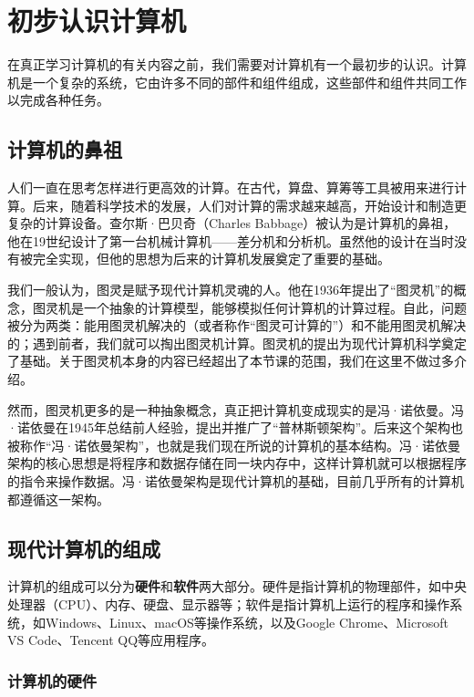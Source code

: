\documentclass[../main.tex]{subfiles}
\begin{document}
\chapter{初步认识计算机}

在真正学习计算机的有关内容之前，我们需要对计算机有一个最初步的认识。计算机是一个复杂的系统，它由许多不同的部件和组件组成，这些部件和组件共同工作以完成各种任务。

\section{计算机的鼻祖}

人们一直在思考怎样进行更高效的计算。在古代，算盘、算筹等工具被用来进行计算。后来，随着科学技术的发展，人们对计算的需求越来越高，开始设计和制造更复杂的计算设备。查尔斯·巴贝奇（Charles Babbage）被认为是计算机的鼻祖，他在19世纪设计了第一台机械计算机——差分机和分析机。虽然他的设计在当时没有被完全实现，但他的思想为后来的计算机发展奠定了重要的基础。

我们一般认为，图灵是赋予现代计算机灵魂的人。他在1936年提出了“图灵机”的概念，图灵机是一个抽象的计算模型，能够模拟任何计算机的计算过程。自此，问题被分为两类：能用图灵机解决的（或者称作“图灵可计算的”）和不能用图灵机解决的；遇到前者，我们就可以掏出图灵机计算。图灵机的提出为现代计算机科学奠定了基础。关于图灵机本身的内容已经超出了本节课的范围，我们在这里不做过多介绍。

然而，图灵机更多的是一种抽象概念，真正把计算机变成现实的是冯·诺依曼。冯·诺依曼在1945年总结前人经验，提出并推广了“普林斯顿架构”。后来这个架构也被称作“冯·诺依曼架构”，也就是我们现在所说的计算机的基本结构。冯·诺依曼架构的核心思想是将程序和数据存储在同一块内存中，这样计算机就可以根据程序的指令来操作数据。冯·诺依曼架构是现代计算机的基础，目前几乎所有的计算机都遵循这一架构。

\section{现代计算机的组成}

计算机的组成可以分为\textbf{硬件}和\textbf{软件}两大部分。硬件是指计算机的物理部件，如中央处理器（CPU）、内存、硬盘、显示器等；软件是指计算机上运行的程序和操作系统，如Windows、Linux、macOS等操作系统，以及Google Chrome、Microsoft VS Code、Tencent QQ等应用程序。

\subsection{计算机的硬件}
\end{document}
